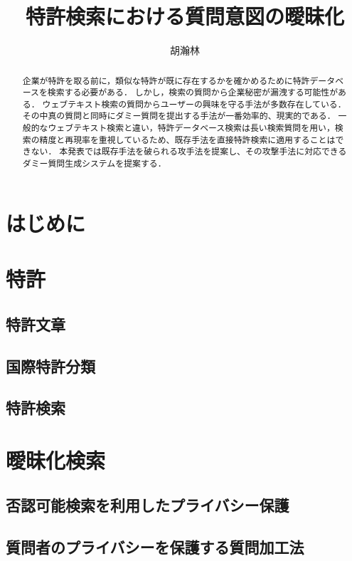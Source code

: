 \documentclass[master]{suribt}
\title{特許検索における質問意図の曖昧化}
\author{胡瀚林}
\begin{document}
\maketitle%

\frontmatter%
\begin{abstract}%
 企業が特許を取る前に，類似な特許が既に存在するかを確かめるために特許データベースを検索する必要がある．
 しかし，検索の質問から企業秘密が漏洩する可能性がある．
 ウェブテキスト検索の質問からユーザーの興味を守る手法が多数存在している．
 その中真の質問と同時にダミー質問を提出する手法が一番効率的、現実的である．
 一般的なウェブテキスト検索と違い，特許データベース検索は長い検索質問を用い，検索の精度と再現率を重視しているため、既存手法を直接特許検索に適用することはできない．
 本発表では既存手法を破られる攻手法を提案し、その攻撃手法に対応できるダミー質問生成システムを提案する．
 \end{abstract}

 \tableofcontents%

 \mainmatter%
 \chapter{はじめに}
 \chapter{特許}
 \section{特許文章}
 \section{国際特許分類}
 \section{特許検索}
 \chapter{曖昧化検索}
 \section{否認可能検索を利用したプライバシー保護\cite{providing2009}}
 \section{質問者のプライバシーを保護する質問加工法\cite{embellishing2010}}
\end{document}
